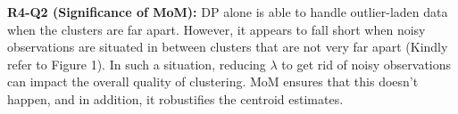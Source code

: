 \documentclass{article}
\begin{document}
\textbf{R4-Q2 (Significance of MoM):} DP alone is able to handle outlier-laden data when the clusters are far apart. However, it appears to fall short when noisy observations are situated in between clusters that are not very far apart (Kindly refer to Figure 1). In such a situation, reducing $\lambda$ to get rid of noisy observations can impact the overall quality of clustering. MoM ensures that this doesn't happen, and in addition, it robustifies the centroid estimates.
\end{document}
